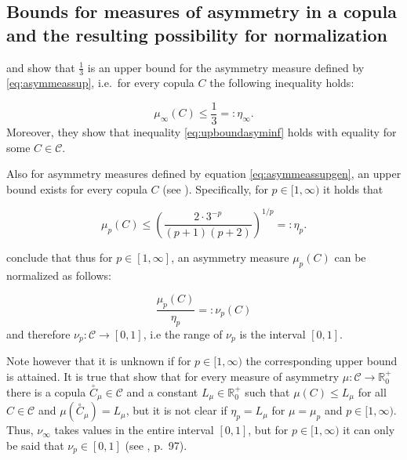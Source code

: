\documentclass[
]{krantz}
\begin{document}
\subsection{Bounds for measures of asymmetry in a copula and the resulting possibility for normalization}\label{bounds}

\citet{klement2006} and \citet{nelsen2007} show that \(\frac{1}{3}\) is an upper bound for the asymmetry measure defined by \eqref{eq:asymmeassup}, i.e.~for every copula \(C\) the following inequality holds:

\begin{equation}
\mu_{\infty}(C) \leq \frac{1}{3} =: \eta_\infty.
\label{eq:upboundasyminf}
\end{equation}
Moreover, they show that inequality \eqref{eq:upboundasyminf} holds with equality for some \(C \in \mathcal{C}\).

Also for asymmetry measures defined by equation \eqref{eq:asymmeassupgen}, an upper bound exists for every copula \(C\) (see \citet{durante2010a}). Specifically, for \(p \in [1,\infty)\) it holds that

\begin{equation}
\mu_p(C) \leq \left( \frac{2 \cdot 3^{-p}}{(p+1)(p+2)} \right)^{1/p} =: \eta_p.
\label{eq:upboundasymp}
\end{equation}

\citet{durante2010a} conclude that thus for \(p \in [1,\infty]\), an asymmetry measure \(\mu_p(C)\) can be normalized as follows:

\begin{equation}
\frac{\mu_p(C)}{\eta_p} =: \nu_p(C)
\label{eq:asymmeasnorm}
\end{equation}
and therefore \(\nu_p:\mathcal{C} \rightarrow [0,1]\), i.e the range of \(\nu_p\) is the interval \([0,1]\).

Note however that it is unknown if for \(p \in [1,\infty)\) the corresponding upper bound is attained. It is true that \citet{durante2010a} show that for every measure of asymmetry \(\mu:\mathcal{C} \rightarrow \mathbb{R}^+_0\) there is a copula \(\overset{\circ}{C}_{\mu} \in \mathcal{C}\) and a constant \(L_{\mu} \in \mathbb{R}^+_0\) such that \(\mu(C) \leq L_{\mu}\) for all \(C \in \mathcal{C}\) and \(\mu(\overset{\circ}{C}_{\mu}) = L_{\mu}\), but it is not clear if \(\eta_p = L_{\mu}\) for \(\mu = \mu_p\) and \(p \in [1,\infty)\). Thus, \(\nu_\infty\) takes values in the entire interval \([0,1]\), but for \(p \in [1,\infty)\) it can only be said that \(\nu_p \in [0,1]\) (see \citet{genest2013}, p.~97).
\end{document}
